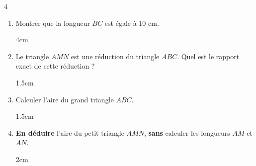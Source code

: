 \documentclass[a4paper]{book}
\begin{document}
{\begin{exerciceNote}{4}
        \begin{center}
        \end{center}
        
        \begin{enumerate}
            \item Montrer que la longueur $BC$ est égale à $10$ cm.
            \begin{ZoneReponse}{4cm}
            \end{ZoneReponse}
            
            \item Le triangle $AMN$ est une réduction du triangle $ABC$. Quel est le rapport exact de cette réduction ?
            \begin{ZoneReponse}{1.5cm}
            \end{ZoneReponse}
            
            \item Calculer l'aire du grand triangle $ABC$.
            \begin{ZoneReponse}{1.5cm}
            \end{ZoneReponse}
            
            \item \textbf{En déduire} l'aire du petit triangle $AMN$, \textbf{sans} calculer les longueurs $AM$ et $AN$.
            \begin{ZoneReponse}{2cm}
            \end{ZoneReponse}
        \end{enumerate}
    \end{exerciceNote}
}


\end{document}
